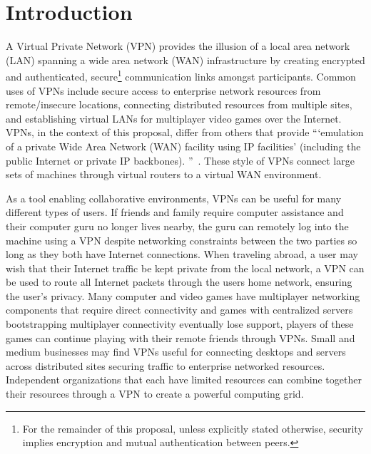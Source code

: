 \chapter{Introduction}
\label{introduction}
A Virtual Private Network (VPN) provides the illusion of a local area network
(LAN) spanning a wide area network (WAN) infrastructure by creating encrypted
and authenticated, secure\footnote{For the remainder of this proposal, unless
explicitly stated otherwise, security implies encryption and mutual
authentication between peers.} communication links amongst participants.
Common uses of VPNs include secure access to enterprise network resources from
remote/insecure locations, connecting distributed resources from multiple
sites, and establishing virtual LANs for multiplayer video games over the
Internet.  VPNs, in the context of this proposal, differ from others that
provide ```emulation of a private Wide Area Network (WAN) facility using IP
facilities' (including the public Internet or private IP backbones).
''~\cite{ip_vpns}.  These style of VPNs connect large sets of machines through
virtual routers to a virtual WAN environment.

As a tool enabling collaborative environments, VPNs can be useful for many
different types of users.  If friends and family require computer assistance
and their computer guru no longer lives nearby, the guru can remotely log into
the machine using a VPN despite networking constraints between the two parties
so long as they both have Internet connections.  When traveling abroad, a user
may wish that their Internet traffic be kept private from the local network, a
VPN can be used to route all Internet packets through the users home network,
ensuring the user's privacy.  Many computer and video games have multiplayer
networking components that require direct connectivity and games with
centralized servers bootstrapping multiplayer connectivity eventually lose
support, players of these games can continue playing with their remote friends
through VPNs.  Small and medium businesses may find VPNs useful for connecting
desktops and servers across distributed sites securing traffic to enterprise
networked resources.  Independent organizations that each have limited
resources can combine together their resources through a VPN to create a
powerful computing grid.


